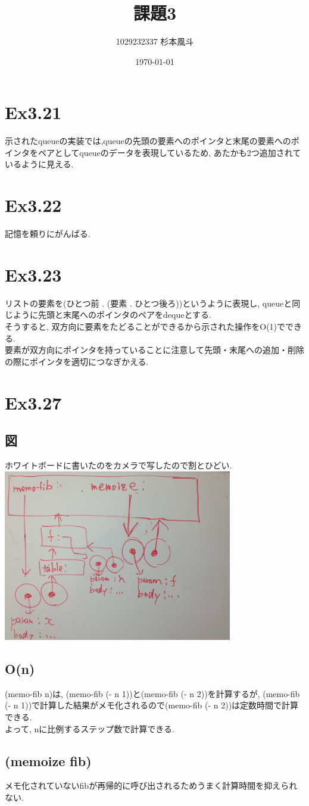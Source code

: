 \documentclass[12pt]{article}
\title{課題3}
\author{1029232337 杉本風斗}
\date{\today}
\begin{document}
\lstset{numbers=left,basicstyle=\small\ttfamily}
\maketitle
\section{Ex3.21}
示されたqueueの実装では,queueの先頭の要素へのポインタと末尾の要素へのポインタをペアとしてqueueのデータを表現しているため, あたかも2つ追加されているように見える.

\section{Ex3.22}
記憶を頼りにがんばる.\\

\section{Ex3.23}
リストの要素を(ひとつ前 . (要素 . ひとつ後ろ))というように表現し, queueと同じように先頭と末尾へのポインタのペアをdequeとする.\\
そうすると, 双方向に要素をたどることができるから示された操作をO(1)でできる.\\
要素が双方向にポインタを持っていることに注意して先頭・末尾への追加・削除の際にポインタを適切につなぎかえる.\\


\section{Ex3.27}
\subsection{図}
ホワイトボードに書いたのをカメラで写したので割とひどい.\\
\includegraphics[width=10cm]{env.jpg}
\subsection{O(n)}
(memo-fib n)は, (memo-fib (- n 1))と(memo-fib (- n 2))を計算するが, (memo-fib (- n 1))で計算した結果がメモ化されるので(memo-fib (- n 2))は定数時間で計算できる.\\
よって, nに比例するステップ数で計算できる.\\

\subsection{(memoize fib)}
メモ化されていないfibが再帰的に呼び出されるためうまく計算時間を抑えられない.\\
\end{document}
